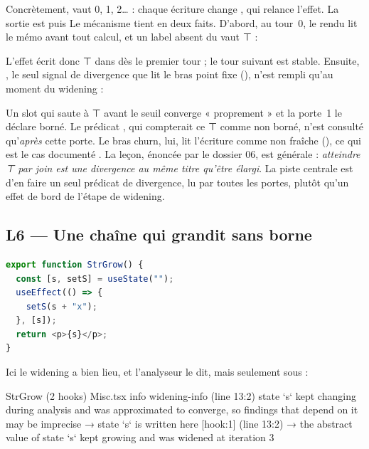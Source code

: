 Concrètement,  vaut 0, 1, 2… : chaque écriture change , qui relance l'effet. La sortie est  puis  Le mécanisme tient en deux faits. D'abord, au tour~0, le rendu lit le mémo avant tout calcul, et un label absent du  vaut ⊤ :


L'effet écrit donc ⊤ dans  dès le premier tour ; le tour suivant est stable. Ensuite, , le seul signal de divergence que lit le bras point fixe (), n'est rempli qu'au moment du widening :


Un slot qui saute à ⊤ avant le seuil converge « proprement » et la porte~1 le déclare borné. Le prédicat , qui compterait ce ⊤ comme non borné, n'est consulté qu'\emph{après} cette porte. Le bras churn, lui, lit l'écriture comme non fraîche (), ce qui est le cas documenté . La leçon, énoncée par le dossier 06, est générale : \emph{atteindre ⊤ par join est une divergence au même titre qu'être élargi}. La piste centrale est d'en faire un seul prédicat de divergence, lu par toutes les portes, plutôt qu'un effet de bord de l'étape de widening.

\subsection{L6 --- Une chaîne qui grandit sans borne}

\begin{lstlisting}[language=TypeScript,caption={\file{/tmp/r27/misc/Misc.tsx}, composant \code{StrGrow}}]
export function StrGrow() {
  const [s, setS] = useState("");
  useEffect(() => {
    setS(s + "x");
  }, [s]);
  return <p>{s}</p>;
}
\end{lstlisting}

Ici le widening a bien lieu, et l'analyseur le dit, mais seulement sous  :

\begin{sortie}
  StrGrow  (2 hooks)  Misc.tsx
    info   widening-info  (line 13:2)  state `s` kept changing during analysis and was approximated to converge, so findings that depend on it may be imprecise
       → state `s` is written here [hook:1] (line 13:2)
       → the abstract value of state `s` kept growing and was widened at iteration 3
\end{sortie}

